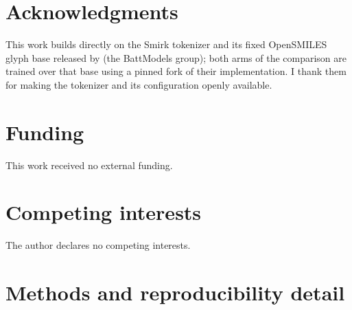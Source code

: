 \documentclass{article}
\begin{document}
\section*{Acknowledgments}

This work builds directly on the Smirk tokenizer and its fixed
OpenSMILES glyph base released by \citet{wadell2026smirk} (the BattModels
group); both arms of the comparison are trained over that base using a pinned
fork of their implementation. I thank them for making the tokenizer and its
configuration openly available.

\section*{Funding}

This work received no external funding.

\section*{Competing interests}

The author declares no competing interests.




\clearpage
\appendix
\renewcommand{\thetable}{A\arabic{table}}
\renewcommand{\theHtable}{app.\arabic{table}}
\setcounter{table}{0}

\section{Methods and reproducibility detail}\label{app:methods}
\end{document}
